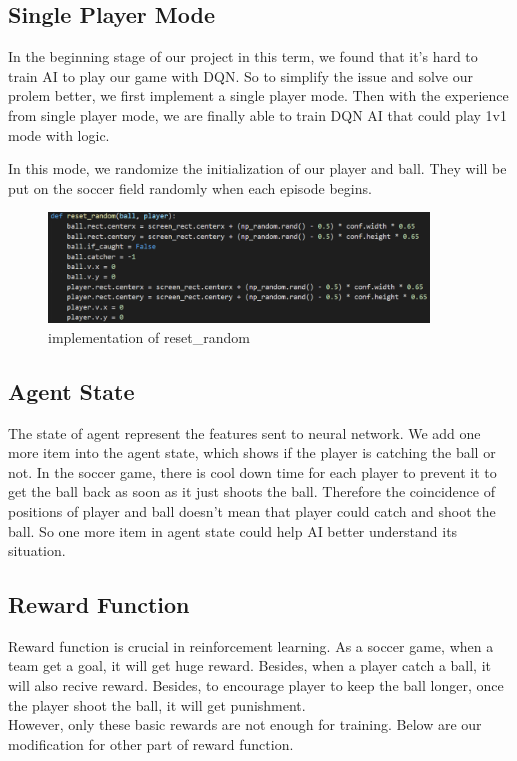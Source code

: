 \documentclass[12pt]{article}
\begin{document}
\subsection{Single Player Mode}
In the beginning stage of our project in this term, we found that it's hard to train AI to play our game with DQN. So to simplify the issue and solve our prolem better, we first implement a single player mode. Then with the experience from single player mode, we are finally able to train DQN AI that could play 1v1 mode with logic.

In this mode, we randomize the initialization of our player and ball. They will be put on the soccer field randomly when each episode begins.
\begin{figure}[H]
	\begin{center}
		\includegraphics[width=0.9\textwidth]{reset_random}
		\caption{implementation of reset\_random}
	\end{center}
\end{figure}


\subsection{Agent State}
The state of agent represent the features sent to neural network. We add one more item into the agent state, which shows if the player is catching the ball or not. In the soccer game, there is cool down time for each player to prevent it to get the ball back as soon as it just shoots the ball. Therefore the coincidence of positions of player and ball doesn't mean that player could catch and shoot the ball. So one more item in agent state could help AI better understand its situation.


\subsection{Reward Function}
Reward function is crucial in reinforcement learning. As a soccer game, when a team get a goal, it will get huge reward. Besides, when a player catch a ball, it will also recive reward. Besides, to encourage player to keep the ball longer, once the player shoot the ball, it will get punishment.\\
However, only these basic rewards are not enough for training. Below are our modification for other part of reward function.
\end{document}

